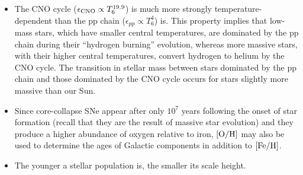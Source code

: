 \documentclass[a4paper,10pt]{article}
\begin{document}
\begin{itemize}
    \item The CNO cycle ($\epsilon_{\rm CNO}\propto T_6^{19.9}$) is much more strongly temperature-dependent than the pp chain ($\epsilon_{pp}\propto T_6^4$) is. This property implies that low-mass stars, which have smaller central temperatures, are dominated by the pp chain during their ``hydrogen burning'' evolution, whereas more massive stars, with their higher central temperatures, convert hydrogen to helium by the CNO cycle. The transition in stellar mass between stars dominated by the pp chain and those dominated by the CNO cycle occurs for stars slightly more massive than our Sun.
    \item Since core-collapse SNe appear after only $10^7$ years following the onset of star formation (recall that they are the result of massive star evolution) and they produce a higher abundance of oxygen relative to iron, $[{\rm O/H}]$ may also be used to determine the ages of Galactic components in addition to $[{\rm Fe/H}]$. 
    \item The younger a stellar population is, the smaller its scale height.
    \end{itemize}
\end{document}
